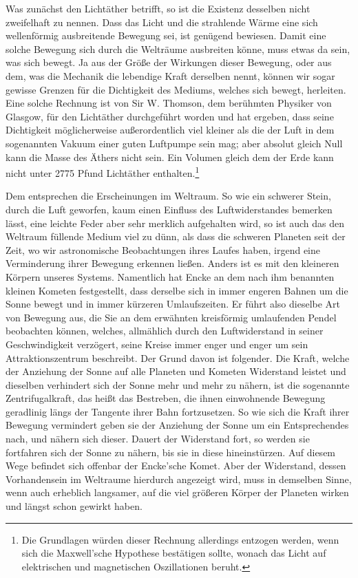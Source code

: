 \documentclass[a4paper, 11pt, oneside, german]{article}
\begin{document}
Was zunächst den Lichtäther betrifft, so ist die Existenz desselben nicht zweifelhaft zu nennen. Dass das Licht und die strahlende Wärme eine sich wellenförmig ausbreitende Bewegung sei, ist genügend bewiesen. Damit eine solche Bewegung sich durch die Welträume ausbreiten könne, muss etwas da sein, was sich bewegt. Ja aus der Größe der Wirkungen dieser Bewegung, oder aus dem, was die Mechanik die lebendige Kraft derselben nennt, können wir sogar gewisse Grenzen für die Dichtigkeit des Mediums, welches sich bewegt, herleiten. Eine solche Rechnung ist von Sir W. Thomson, dem berühmten Physiker von Glasgow, für den Lichtäther durchgeführt worden und hat ergeben, dass seine Dichtigkeit möglicherweise außerordentlich viel kleiner als die der Luft in dem sogenannten Vakuum einer guten Luftpumpe sein mag; aber absolut gleich Null kann die Masse des Äthers nicht sein. Ein Volumen gleich dem der Erde kann nicht unter 2775 Pfund Lichtäther enthalten.\footnote{Die Grundlagen würden dieser Rechnung allerdings entzogen werden, wenn sich die Maxwell'sche Hypothese bestätigen sollte, wonach das Licht auf elektrischen und magnetischen Oszillationen beruht.}

Dem entsprechen die Erscheinungen im Weltraum. So wie ein schwerer Stein, durch die Luft geworfen, kaum einen Einfluss des Luftwiderstandes bemerken lässt, eine leichte Feder aber sehr merklich aufgehalten wird, so ist auch das den Weltraum füllende Medium viel zu dünn, als dass die schweren Planeten seit der Zeit, wo wir astronomische Beobachtungen ihres Laufes haben, irgend eine Verminderung ihrer Bewegung erkennen ließen. Anders ist es mit den kleineren Körpern unseres Systems. Namentlich hat Encke an dem nach ihm benannten kleinen Kometen festgestellt, dass derselbe sich in immer engeren Bahnen um die Sonne bewegt und in immer kürzeren Umlaufszeiten. Er führt also dieselbe Art von Bewegung aus, die Sie an dem erwähnten kreisförmig umlaufenden Pendel beobachten können, welches, allmählich durch den Luftwiderstand in seiner Geschwindigkeit verzögert, seine Kreise immer enger und enger um sein Attraktionszentrum beschreibt. Der Grund davon ist folgender. Die Kraft, welche der Anziehung der Sonne auf alle Planeten und Kometen Widerstand leistet und dieselben verhindert sich der Sonne mehr und mehr zu nähern, ist die sogenannte Zentrifugalkraft, das heißt das Bestreben, die ihnen einwohnende Bewegung geradlinig längs der Tangente ihrer Bahn fortzusetzen. So wie sich die Kraft ihrer Bewegung vermindert geben sie der Anziehung der Sonne um ein Entsprechendes nach, und nähern sich dieser. Dauert der Widerstand fort, so werden sie fortfahren sich der Sonne zu nähern, bis sie in diese hineinstürzen. Auf diesem Wege befindet sich offenbar der Encke'sche Komet. Aber der Widerstand, dessen Vorhandensein im Weltraume hierdurch angezeigt wird, muss in demselben Sinne, wenn auch erheblich langsamer, auf die viel größeren Körper der Planeten wirken und längst schon gewirkt haben.
\end{document}
